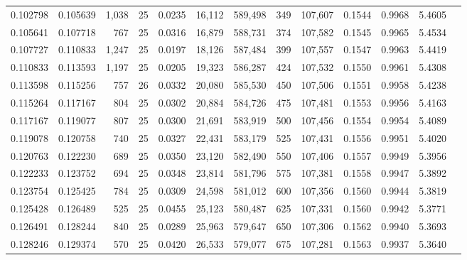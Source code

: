\begin{tabular}{rrrrrrrrrrrrr}
0.102798 & 0.105639 & 1,038 &  25 &                                     0.0235 &  16,112 & 589,498 &     349 & 107,607 & 0.1544 & 0.9968 & 5.4605 \\
0.105641 & 0.107718 &   767 &  25 &                                     0.0316 &  16,879 & 588,731 &     374 & 107,582 & 0.1545 & 0.9965 & 5.4534 \\
0.107727 & 0.110833 & 1,247 &  25 &                                     0.0197 &  18,126 & 587,484 &     399 & 107,557 & 0.1547 & 0.9963 & 5.4419 \\
0.110833 & 0.113593 & 1,197 &  25 &                                     0.0205 &  19,323 & 586,287 &     424 & 107,532 & 0.1550 & 0.9961 & 5.4308 \\
0.113598 & 0.115256 &   757 &  26 &                                     0.0332 &  20,080 & 585,530 &     450 & 107,506 & 0.1551 & 0.9958 & 5.4238 \\
0.115264 & 0.117167 &   804 &  25 &                                     0.0302 &  20,884 & 584,726 &     475 & 107,481 & 0.1553 & 0.9956 & 5.4163 \\
0.117167 & 0.119077 &   807 &  25 &                                     0.0300 &  21,691 & 583,919 &     500 & 107,456 & 0.1554 & 0.9954 & 5.4089 \\
0.119078 & 0.120758 &   740 &  25 &                                     0.0327 &  22,431 & 583,179 &     525 & 107,431 & 0.1556 & 0.9951 & 5.4020 \\
0.120763 & 0.122230 &   689 &  25 &                                     0.0350 &  23,120 & 582,490 &     550 & 107,406 & 0.1557 & 0.9949 & 5.3956 \\
0.122233 & 0.123752 &   694 &  25 &                                     0.0348 &  23,814 & 581,796 &     575 & 107,381 & 0.1558 & 0.9947 & 5.3892 \\
0.123754 & 0.125425 &   784 &  25 &                                     0.0309 &  24,598 & 581,012 &     600 & 107,356 & 0.1560 & 0.9944 & 5.3819 \\
0.125428 & 0.126489 &   525 &  25 &                                     0.0455 &  25,123 & 580,487 &     625 & 107,331 & 0.1560 & 0.9942 & 5.3771 \\
0.126491 & 0.128244 &   840 &  25 &                                     0.0289 &  25,963 & 579,647 &     650 & 107,306 & 0.1562 & 0.9940 & 5.3693 \\
0.128246 & 0.129374 &   570 &  25 &                                     0.0420 &  26,533 & 579,077 &     675 & 107,281 & 0.1563 & 0.9937 & 5.3640 \\

\end{tabular}
